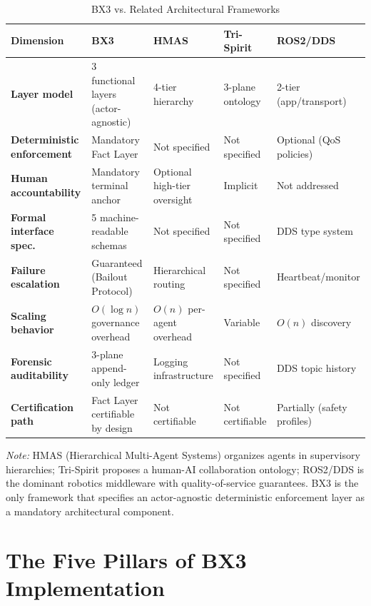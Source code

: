 \documentclass[12pt]{article}
\theoremstyle{plain}
\begin{document}
\begin{table}[htbp]
\caption{BX3 vs. Related Architectural Frameworks}
\label{tab:comparison}
\begin{center}
\begin{tabular}{>{\bfseries}p{2.4cm} p{2.4cm} p{2.4cm} p{2.4cm} p{2.4cm}}
\toprule
\textbf{Dimension} & \textbf{BX3} & \textbf{HMAS} & \textbf{Tri-Spirit} & \textbf{ROS2/DDS} \\
\midrule
Layer model & 3 functional layers (actor-agnostic) & 4-tier hierarchy & 3-plane ontology & 2-tier (app/transport) \\
\addlinespace
Deterministic enforcement & Mandatory Fact Layer & Not specified & Not specified & Optional (QoS policies) \\
\addlinespace
Human accountability & Mandatory terminal anchor & Optional high-tier oversight & Implicit & Not addressed \\
\addlinespace
Formal interface spec. & 5 machine-readable schemas & Not specified & Not specified & DDS type system \\
\addlinespace
Failure escalation & Guaranteed (Bailout Protocol) & Hierarchical routing & Not specified & Heartbeat/monitor \\
\addlinespace
Scaling behavior & $O(\log n)$ governance overhead & $O(n)$ per-agent overhead & Variable & $O(n)$ discovery \\
\addlinespace
Forensic auditability & 3-plane append-only ledger & Logging infrastructure & Not specified & DDS topic history \\
\addlinespace
Certification path & Fact Layer certifiable by design & Not certifiable & Not certifiable & Partially (safety profiles) \\
\bottomrule
\end{tabular}
\end{center}
\end{table}
\noindent\textit{Note:} HMAS (Hierarchical Multi-Agent Systems) \cite{ouhamma2024hmas} organizes agents in supervisory hierarchies; Tri-Spirit \cite{wang2024trispirit} proposes a human-AI collaboration ontology; ROS2/DDS \cite{ros2dds} is the dominant robotics middleware with quality-of-service guarantees. BX3 is the only framework that specifies an actor-agnostic deterministic enforcement layer as a mandatory architectural component.

\section{The Five Pillars of BX3 Implementation}
\label{sec:pillars}
\end{document}
